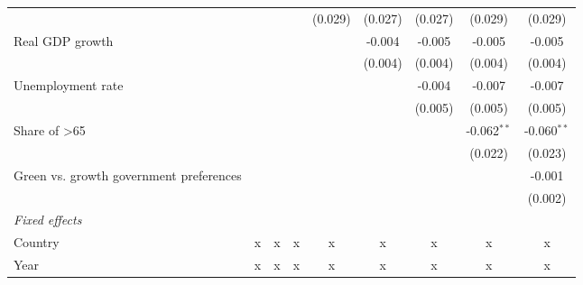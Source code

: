 \begin{table}[htbp]
\begin{tabular}{lcccccccc}
                                                                                         &         &         &               & (0.029)       & (0.027)        & (0.027)        & (0.029)       & (0.029)\\   
      Real GDP growth                                                                    &         &         &               &               & -0.004         & -0.005         & -0.005        & -0.005\\   
                                                                                         &         &         &               &               & (0.004)        & (0.004)        & (0.004)       & (0.004)\\   
      Unemployment rate                                                                  &         &         &               &               &                & -0.004         & -0.007        & -0.007\\   
                                                                                         &         &         &               &               &                & (0.005)        & (0.005)       & (0.005)\\   
      Share of >65                                                                       &         &         &               &               &                &                & -0.062$^{**}$ & -0.060$^{**}$\\   
                                                                                         &         &         &               &               &                &                & (0.022)       & (0.023)\\   
      Green vs. growth government preferences                                            &         &         &               &               &                &                &               & -0.001\\   
                                                                                         &         &         &               &               &                &                &               & (0.002)\\   
      \emph{Fixed effects}\\
      Country                                                                            & x       & x       & x             & x             & x              & x              & x             & x\\  
      Year                                                                               & x       & x       & x             & x             & x              & x              & x             & x\\  

\end{tabular}
\end{table}
